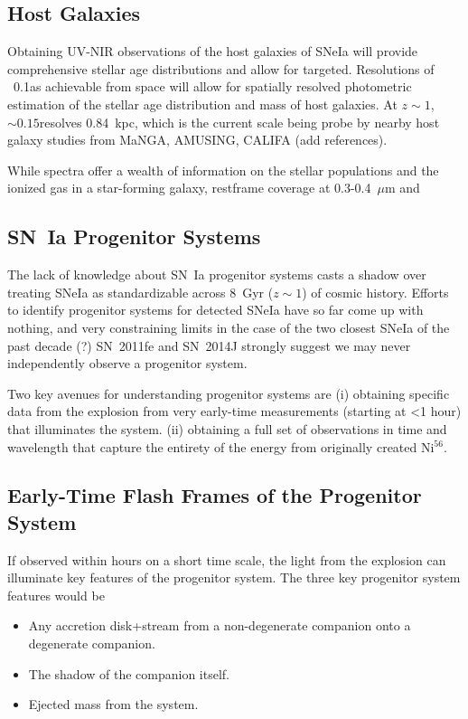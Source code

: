 \documentclass[12pt,preprint]{aastex}
\newcommand{\tbd}{{\color{red}}}
\begin{document}
\subsection{Host Galaxies}

Obtaining UV-NIR observations of the host galaxies of SNeIa will provide comprehensive stellar age distributions and allow for targeted.  Resolutions of ~0.1\arcsec as achievable from space will allow for spatially resolved photometric estimation of the stellar age distribution and mass of host galaxies.  At $z\sim1$, $\sim0.15$\arcsec resolves 0.84~kpc, which is the current scale being probe by nearby host galaxy studies from MaNGA, AMUSING, CALIFA ({\tbd add references}).

While spectra offer a wealth of information on the stellar populations and the ionized gas in a star-forming galaxy, restframe coverage at 0.3-0.4~$\mu$m and

\subsection{SN~Ia Progenitor Systems}

The lack of knowledge about SN~Ia progenitor systems casts a shadow over treating SNeIa as standardizable across 8~Gyr ($z\sim1$) of cosmic history.  Efforts to identify progenitor systems for detected SNeIa have so far come up with nothing, and very constraining limits in the case of the two closest SNeIa of the past decade (?) SN~2011fe \citep{Li11} and SN~2014J \citep{Nielsen14, Perez-Torres14, Goobar15, Sand16, Graur19} strongly suggest we may never independently observe a progenitor system.

Two key avenues for understanding progenitor systems are
(i) obtaining specific data from the explosion from very early-time measurements (starting at <1 hour) that illuminates the system.
(ii) obtaining a full set of observations in time and wavelength that capture the entirety of the energy from originally created Ni$^{56}$.

\subsection{Early-Time Flash Frames of the Progenitor System}
If observed within hours on a short time scale, the light from the explosion can illuminate key features of the progenitor system.  The three key progenitor system features would be
\begin{itemize}
\item Any accretion disk+stream from a non-degenerate companion onto a degenerate companion.
\item The shadow of the companion itself.
\item Ejected mass from the system.
\end{itemize}
\end{document}
